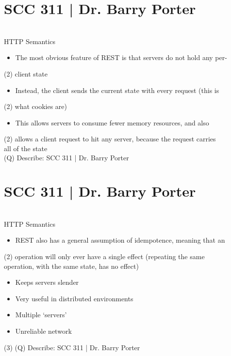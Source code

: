 \documentclass[12pt]{article}
\begin{document}
\section{SCC 311 | Dr. Barry Porter}
\\
HTTP Semantics\\
\begin{itemize}
  \item The most obvious feature of REST is that servers do not hold any per-
\end{itemize}(2)
client state\\
\begin{itemize}
  \item Instead, the client sends the current state with every request (this is
\end{itemize}(2)
what cookies are)\\
\begin{itemize}
  \item This allows servers to consume fewer memory resources, and also 
\end{itemize}(2)
allows a client request to hit any server, because the request carries \\
all of the state\\
\clearpage
(Q)
Describe: SCC 311 | Dr. Barry Porter
\clearpage
\section{SCC 311 | Dr. Barry Porter}
\\
HTTP Semantics\\
\begin{itemize}
  \item REST also has a general assumption of idempotence, meaning that an 
\end{itemize}(2)
operation will only ever have a single effect (repeating the same \\
operation, with the same state, has no effect)\\
\begin{itemize}
  \item Keeps servers slender
  \item Very useful in distributed environments
  \item Multiple ‘servers’
  \item Unreliable network
\end{itemize}(3)
\clearpage
(Q)
Describe: SCC 311 | Dr. Barry Porter
\clearpage
\end{document}
